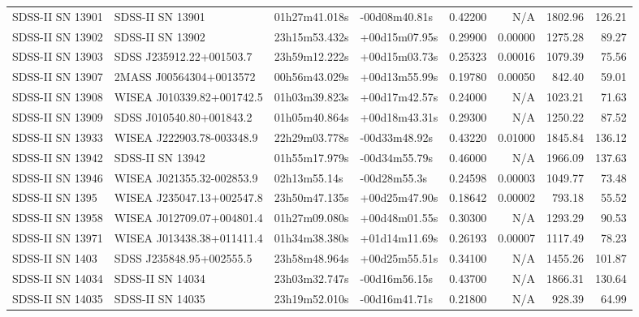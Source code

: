 \begin{longtable}{llllrrrr}
SDSS-II SN 13901 &                SDSS-II SN 13901 &   01h27m41.018s &   -00d08m40.81s &  0.42200 &      N/A &  1802.96 &      126.21 \\
SDSS-II SN 13902 &                SDSS-II SN 13902 &   23h15m53.432s &   +00d15m07.95s &  0.29900 &  0.00000 &  1275.28 &       89.27 \\
SDSS-II SN 13903 &        SDSS J235912.22+001503.7 &   23h59m12.222s &   +00d15m03.73s &  0.25323 &  0.00016 &  1079.39 &       75.56 \\
SDSS-II SN 13907 &         2MASS J00564304+0013572 &   00h56m43.029s &   +00d13m55.99s &  0.19780 &  0.00050 &   842.40 &       59.01 \\
SDSS-II SN 13908 &       WISEA J010339.82+001742.5 &   01h03m39.823s &   +00d17m42.57s &  0.24000 &      N/A &  1023.21 &       71.63 \\
SDSS-II SN 13909 &        SDSS J010540.80+001843.2 &   01h05m40.864s &   +00d18m43.31s &  0.29300 &      N/A &  1250.22 &       87.52 \\
SDSS-II SN 13933 &       WISEA J222903.78-003348.9 &   22h29m03.778s &   -00d33m48.92s &  0.43220 &  0.01000 &  1845.84 &      136.12 \\
SDSS-II SN 13942 &                SDSS-II SN 13942 &   01h55m17.979s &   -00d34m55.79s &  0.46000 &      N/A &  1966.09 &      137.63 \\
SDSS-II SN 13946 &       WISEA J021355.32-002853.9 &    02h13m55.14s &    -00d28m55.3s &  0.24598 &  0.00003 &  1049.77 &       73.48 \\
SDSS-II SN 1395  &       WISEA J235047.13+002547.8 &   23h50m47.135s &   +00d25m47.90s &  0.18642 &  0.00002 &   793.18 &       55.52 \\
SDSS-II SN 13958 &       WISEA J012709.07+004801.4 &   01h27m09.080s &   +00d48m01.55s &  0.30300 &      N/A &  1293.29 &       90.53 \\
SDSS-II SN 13971 &       WISEA J013438.38+011411.4 &   01h34m38.380s &   +01d14m11.69s &  0.26193 &  0.00007 &  1117.49 &       78.23 \\
SDSS-II SN 1403  &        SDSS J235848.95+002555.5 &   23h58m48.964s &   +00d25m55.51s &  0.34100 &      N/A &  1455.26 &      101.87 \\
SDSS-II SN 14034 &                SDSS-II SN 14034 &   23h03m32.747s &   -00d16m56.15s &  0.43700 &      N/A &  1866.31 &      130.64 \\
SDSS-II SN 14035 &                SDSS-II SN 14035 &   23h19m52.010s &   -00d16m41.71s &  0.21800 &      N/A &   928.39 &       64.99 \\

\end{longtable}
